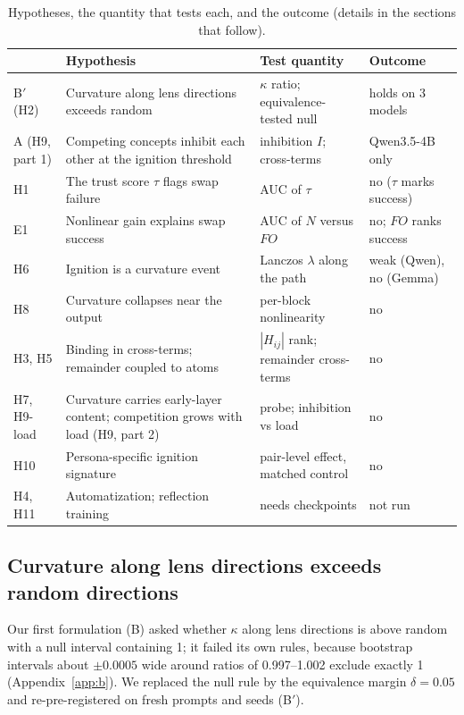 \documentclass[10pt]{article}
\begin{document}
\begin{table}[!t]
\centering\footnotesize
\begin{tabular}{@{}p{0.9cm}p{5.6cm}p{4.3cm}p{3.7cm}@{}}
\toprule
 & Hypothesis & Test quantity & Outcome \\
\midrule
B$'$ (H2) & Curvature along lens directions exceeds random & $\kappa$ ratio; equivalence-tested null & holds on 3 models \\
A (H9, part 1) & Competing concepts inhibit each other at the ignition threshold & inhibition $I$; cross-terms & Qwen3.5-4B only \\
H1 & The trust score $\tau$ flags swap failure & AUC of $\tau$ & no ($\tau$ marks success) \\
E1 & Nonlinear gain explains swap success & AUC of $N$ versus $FO$ & no; $FO$ ranks success \\
H6 & Ignition is a curvature event & Lanczos $\lambda$ along the path & weak (Qwen), no (Gemma) \\
H8 & Curvature collapses near the output & per-block nonlinearity & no \\
H3, H5 & Binding in cross-terms; remainder coupled to atoms & $|H_{ij}|$ rank; remainder cross-terms & no \\
H7, H9-load & Curvature carries early-layer content; competition grows with load (H9, part 2) & probe; inhibition vs load & no \\
H10 & Persona-specific ignition signature & pair-level effect, matched control & no \\
H4, H11 & Automatization; reflection training & needs checkpoints & not run \\
\bottomrule
\end{tabular}
\caption{Hypotheses, the quantity that tests each, and the outcome (details in the sections that follow).}
\label{tab:hyp}
\end{table}

\subsection{Curvature along lens directions exceeds random directions}
\label{sec:bprime}
Our first formulation (B) asked whether $\kappa$ along lens directions is above random with a null interval containing 1; it failed its own rules, because bootstrap intervals about $\pm0.0005$ wide around ratios of 0.997--1.002 exclude exactly 1 (Appendix~\ref{app:b}). We replaced the null rule by the equivalence margin $\delta=0.05$ and re-pre-registered on fresh prompts and seeds (B$'$).
\end{document}
